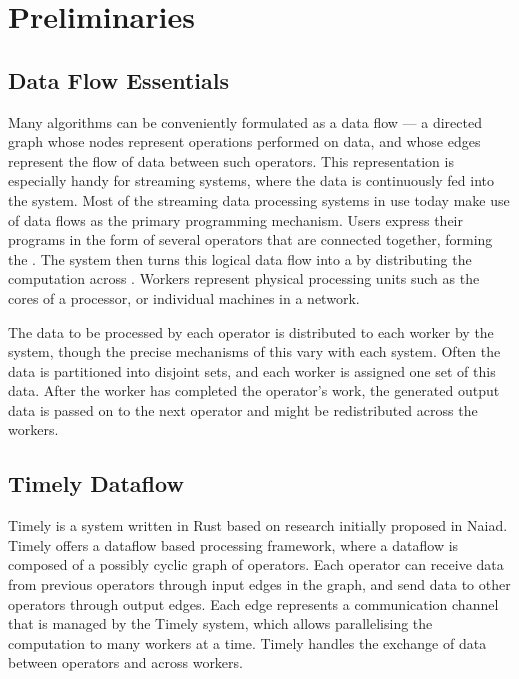 \section{Preliminaries}
\subsection{Data Flow Essentials}
Many algorithms can be conveniently formulated as a data flow --- a directed graph whose nodes represent operations performed on data, and whose edges represent the flow of data between such operators. This representation is especially handy for streaming systems, where the data is continuously fed into the system. Most of the streaming data processing systems in use today make use of data flows as the primary programming mechanism. Users express their programs in the form of several operators that are connected together, forming the . The system then turns this logical data flow into a  by distributing the computation across . Workers represent physical processing units such as the cores of a processor, or individual machines in a network. \\


The data to be processed by each operator is distributed to each worker by the system, though the precise mechanisms of this vary with each system. Often the data is partitioned into disjoint sets, and each worker is assigned one set of this data. After the worker has completed the operator's work, the generated output data is passed on to the next operator and might be redistributed across the workers.

\subsection{Timely Dataflow}
Timely\cite{timely} is a system written in Rust based on research initially proposed in Naiad\cite{naiad}. Timely offers a dataflow based processing framework, where a dataflow is composed of a possibly cyclic graph of operators. Each operator can receive data from previous operators through input edges in the graph, and send data to other operators through output edges. Each edge represents a communication channel that is managed by the Timely system, which allows parallelising the computation to many workers at a time. Timely handles the exchange of data between operators and across workers. \\

